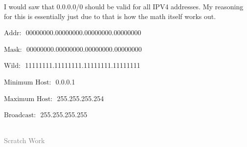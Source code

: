 \documentclass[12pt,addpoints,answers]{exam}
\begin{document}
\begin{solution}[1in]
	I would saw that 0.0.0.0/0 should be valid for all IPV4 addresses.  My reasoning for this is essentially just due to that is how the math itself works out. 
	\begin{center}
		$\textrm{Addr: }$ 00000000.00000000.00000000.00000000
		
		$\textrm{Mask: }$ 00000000.00000000.00000000.00000000
		
		$\textrm{Wild: }$ 11111111.11111111.11111111.11111111
		
		$\textrm{Minimum Host: }$ 0.0.0.1
		
		$\textrm{Maximum Host: }$ 255.255.255.254
		
		$\textrm{Broadcast: }$ 255.255.255.255
	\end{center}
\end{solution}

\newpage
\begin{center}\hrulefill\\\textcolor{gray}{Scratch Work}\end{center}
\vfill
\begin{center}\gradetable[v][questions]\end{center}
\end{document}
